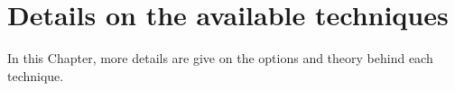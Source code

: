 \chapter{Details on the available techniques}
In this Chapter, more details are give on the options and theory behind each technique.